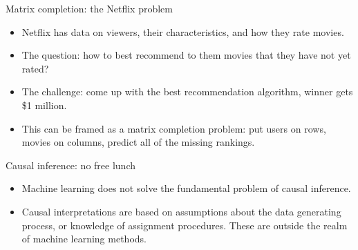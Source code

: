 \documentclass[xcolor={dvipsnames},handout]{beamer}
\begin{document}

\begin{frame}{Matrix completion: the Netflix problem}

\begin{itemize}
\item Netflix has data on viewers, their characteristics, and how they rate movies.
\item The question: how to best recommend to them movies that they have not yet rated?
\item The challenge: come up with the best recommendation algorithm, winner gets \$1 million.
\item This can be framed as a matrix completion problem: put users on rows, movies on columns, predict all of the missing rankings.
\end{itemize}

\end{frame}



\begin{frame}{Causal inference: no free lunch}


\begin{itemize}
\item Machine learning does not solve the fundamental problem of causal inference.
\item Causal interpretations are based on assumptions about the data generating process, or knowledge of assignment procedures. These are outside the realm of machine learning methods.
\end{itemize}

\end{frame}


\end{document}
